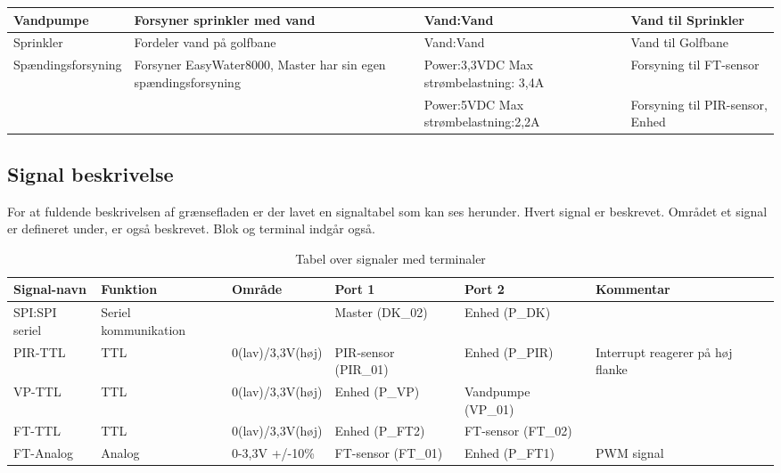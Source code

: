 \begin{table}[H]
\begin{small}
\begin{tabular}{|p{}|p{}|p{}|p{}|}
Vandpumpe & Forsyner sprinkler med vand & Vand:Vand & Vand til Sprinkler \\ \hline
 
Sprinkler & Fordeler vand på golfbane & Vand:Vand & Vand til Golfbane \\ \hline

Spændingsforsyning & Forsyner EasyWater8000, Master har sin egen spændingsforsyning & Power:3,3VDC \newline Max strømbelastning: 3,4A & Forsyning til FT-sensor \\ \cline{3-4}
& & Power:5VDC \newline Max strømbelastning:2,2A		& Forsyning til PIR-sensor, Enhed 	\\ \hline
\end{tabular}
\end{small}
\label{table:Bloktabel}
\end{table}

\begin{table}[H]
\subsection{Signal beskrivelse}
For at fuldende beskrivelsen af grænsefladen er der lavet en signaltabel som kan ses herunder. Hvert signal er beskrevet. Området et signal er defineret under, er også beskrevet. Blok og terminal indgår også. 
\caption{Tabel over signaler med terminaler}
\begin{small}
\begin{tabular}{|p{2cm}|p{2cm}|p{2cm}|p{2cm}|p{2cm}|p{}|}
\hline

\textbf{Signal-navn}	&\textbf{Funktion} 		&\textbf{Område} &\textbf{Port 1} 	&\textbf{Port 2} 			&\textbf{Kommentar} \\ \hline

SPI:SPI seriel 			&Seriel kommunikation 	& 				&Master (DK\_02)		&Enhed (P\_DK)			&					 \\\hline

PIR-TTL 					&TTL 					&0(lav)\slash3,3V(høj) 	&PIR-sensor (PIR\_01) &Enhed (P\_PIR)			&Interrupt reagerer på høj flanke 					\\\hline
VP-TTL 					&TTL 					&0(lav)\slash3,3V(høj) 	&Enhed (P\_VP)  &Vandpumpe (VP\_01)				&					\\\hline
					
FT-TTL					&TTL						&0(lav)\slash3,3V(høj) 	&Enhed (P\_FT2) &FT-sensor (FT\_02)				&	    				\\\hline
FT-Analog				&Analog 					&0-3,3V 	\newline +/-10\%	&FT-sensor (FT\_01) &Enhed (P\_FT1)				& PWM signal	    				\\\hline

\end{tabular}
\end{small}
\label{table:Signaltabel}
\end{table}